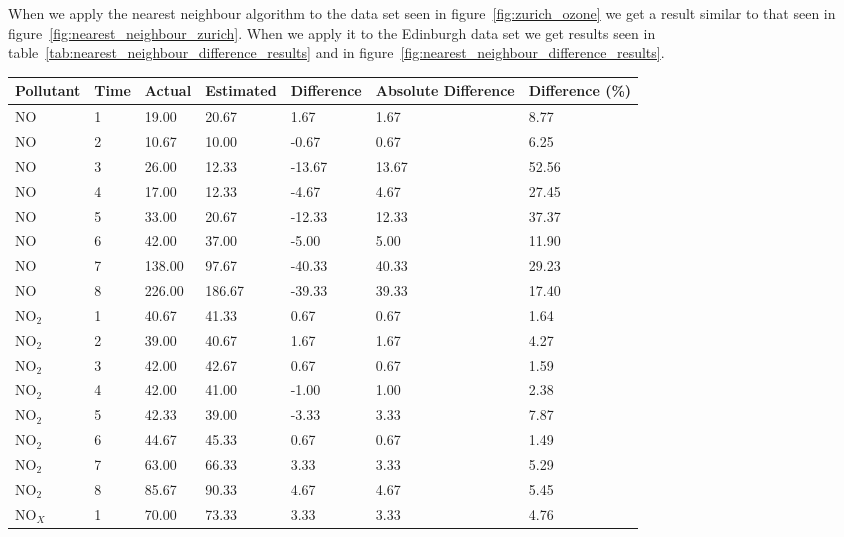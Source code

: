
        When we apply the nearest neighbour algorithm to the data set seen in figure~\ref{fig:zurich_ozone} we get a result similar to that seen in figure~\ref{fig:nearest_neighbour_zurich}. When we apply it to the Edinburgh data set we get results seen in table~\ref{tab:nearest_neighbour_difference_results} and in figure~\ref{fig:nearest_neighbour_difference_results}. 

        \begin{table}[H]
        	\centering
    		\begin{tabular}{|l|l|l|l|l|l|l|}
    			\hline
		        Pollutant & Time & Actual & Estimated & Difference & Absolute Difference & Difference (\%) \\ \hline
				NO & 1 & 19.00 & 20.67 & 1.67 & 1.67 & 8.77 \\
				NO & 2 & 10.67 & 10.00 & -0.67 & 0.67 & 6.25 \\
				NO & 3 & 26.00 & 12.33 & -13.67 & 13.67 & 52.56 \\
				NO & 4 & 17.00 & 12.33 & -4.67 & 4.67 & 27.45 \\
				NO & 5 & 33.00 & 20.67 & -12.33 & 12.33 & 37.37 \\
				NO & 6 & 42.00 & 37.00 & -5.00 & 5.00 & 11.90 \\
				NO & 7 & 138.00 & 97.67 & -40.33 & 40.33 & 29.23 \\
				NO & 8 & 226.00 & 186.67 & -39.33 & 39.33 & 17.40 \\
				NO$_{2}$ & 1 & 40.67 & 41.33 & 0.67 & 0.67 & 1.64 \\
				NO$_{2}$ & 2 & 39.00 & 40.67 & 1.67 & 1.67 & 4.27 \\
				NO$_{2}$ & 3 & 42.00 & 42.67 & 0.67 & 0.67 & 1.59 \\
				NO$_{2}$ & 4 & 42.00 & 41.00 & -1.00 & 1.00 & 2.38 \\
				NO$_{2}$ & 5 & 42.33 & 39.00 & -3.33 & 3.33 & 7.87 \\
				NO$_{2}$ & 6 & 44.67 & 45.33 & 0.67 & 0.67 & 1.49 \\
				NO$_{2}$ & 7 & 63.00 & 66.33 & 3.33 & 3.33 & 5.29 \\
				NO$_{2}$ & 8 & 85.67 & 90.33 & 4.67 & 4.67 & 5.45 \\
				NO$_{X}$ & 1 & 70.00 & 73.33 & 3.33 & 3.33 & 4.76 \\

\end{tabular}
\end{table}
